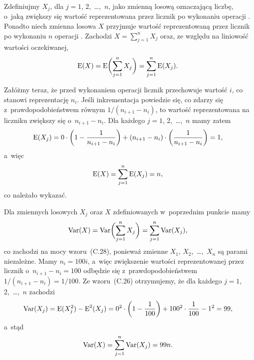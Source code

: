 \problems


\subproblem %
Zdefiniujmy $X_j$, dla $j=1$, 2,~\dots,~$n$, jako zmienną losową oznaczającą liczbę, o~jaką zwiększy się wartość reprezentowana przez licznik po  wykonaniu operacji . Ponadto niech zmienna losowa $X$ przyjmuje wartość reprezentowaną przez licznik po wykonaniu $n$ operacji . Zachodzi $X=\sum_{j=1}^nX_j$ oraz, ze względu na liniowość wartości oczekiwanej,
\[
	\operatorname{E}(X) = \operatorname{E}\biggl(\sum_{j=1}^nX_j\biggr) = \sum_{j=1}^n\operatorname{E}(X_j).
\]

Załóżmy teraz, że przed wykonaniem  operacji  licznik przechowuje wartość $i$, co stanowi reprezentację $n_i$. Jeśli inkrementacja powiedzie się, co zdarzy się z~prawdopodobieństwem równym $1/(n_{i+1}-n_i)$, to wartość reprezentowana na liczniku zwiększy się o~$n_{i+1}-n_i$. Dla każdego $j=1$, 2,~\dots,~$n$ mamy zatem
\[
	\operatorname{E}(X_j) = 0\cdot\biggl(1-\frac{1}{n_{i+1}-n_i}\biggr)+(n_{i+1}-n_i)\cdot\biggl(\frac{1}{n_{i+1}-n_i}\biggr) = 1,
\]
a~więc
\[
	\operatorname{E}(X) = \sum_{j=1}^n\operatorname{E}(X_j) = n,
\]
co należało wykazać.

\subproblem %
Dla zmiennych losowych $X_j$ oraz $X$ zdefiniowanych w~poprzednim punkcie mamy
\[
	\operatorname{Var}(X) = \operatorname{Var}\biggl(\sum_{j=1}^nX_j\biggr) = \sum_{j=1}^n\operatorname{Var}(X_j),
\]
co zachodzi na mocy wzoru~(C.28), ponieważ zmienne $X_1$, $X_2$,~\dots,~$X_n$ są parami niezależne. Mamy $n_i=100i$, a~więc zwiększenie wartości reprezentowanej przez licznik o~$n_{i+1}-n_i=100$ odbędzie się z~prawdopodobieństwem $1/(n_{i+1}-n_i)=1/100$. Ze wzoru~(C.26) otrzymujemy, że dla każdego $j=1$, 2,~\dots,~$n$ zachodzi
\[
	\operatorname{Var}(X_j) = \operatorname{E}(X_j^2)-\operatorname{E}^2(X_j) = 0^2\cdot\biggl(1-\frac{1}{100}\biggr)+100^2\cdot\frac{1}{100}-1^2 = 99,
\]
a~stąd
\[
	\operatorname{Var}(X) = \sum_{j=1}^n\operatorname{Var}(X_j) = 99n.
\]


